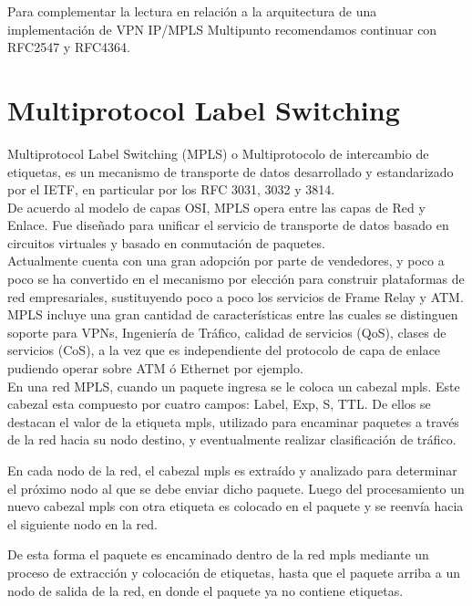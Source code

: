 Para complementar la lectura en relaci\'on a la arquitectura de una implementaci\'on de VPN IP/MPLS Multipunto recomendamos continuar con RFC2547\citep{rosen1999bgp} y RFC4364\citep{rosen2006bgp}.

\section{Multiprotocol Label Switching}
\label{section2.8}

Multiprotocol Label Switching (MPLS) o Multiprotocolo de intercambio de etiquetas, es un mecanismo de transporte de datos desarrollado y estandarizado por el IETF, en particular por los RFC 3031\cite{rosen2001multiprotocol}, 3032\citep{rosen2001mpls} y 3814\citep{nadeau2004multiprotocol}.\\

De acuerdo al modelo de capas OSI, MPLS opera entre las capas de Red y Enlace. Fue diseñado para unificar el servicio de transporte de datos basado en circuitos virtuales y basado en conmutación de paquetes.\\

Actualmente cuenta con una gran adopción por parte de vendedores, y poco a poco se ha convertido en el mecanismo por elección para construir plataformas de red empresariales, sustituyendo poco a poco los servicios de Frame Relay y ATM.\\
 
MPLS incluye una gran cantidad de características entre las cuales se distinguen soporte para VPNs, Ingeniería de Tráfico, calidad de servicios (QoS), clases de servicios (CoS), a la vez que es independiente del protocolo de capa de enlace pudiendo operar sobre ATM ó Ethernet por ejemplo.\\

En una red MPLS, cuando un paquete ingresa se le coloca un cabezal mpls. Este cabezal esta compuesto por cuatro campos: Label, Exp, S, TTL. De ellos se destacan el valor de la etiqueta mpls, utilizado para encaminar paquetes a través de la red hacia su nodo destino, y eventualmente realizar clasificación de tr\'afico.

En cada nodo de la red, el cabezal mpls es extraído y analizado para determinar el próximo nodo al que se debe enviar dicho paquete. Luego del procesamiento un nuevo cabezal mpls con otra etiqueta es colocado en el paquete y se reenvía hacia el siguiente nodo en la red.

De esta forma el paquete es encaminado dentro de la red mpls mediante un proceso de extracción y colocación de etiquetas, hasta que el paquete arriba a un nodo de salida de la red, en donde el paquete ya no contiene etiquetas.\\

